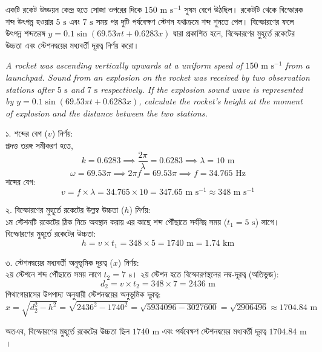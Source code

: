 \documentclass[12pt, a4paper]{article}
\begin{document}
\begin{tcolorbox}[questionbox={প্রশ্ন (Question) 8}]
\noindent
একটি রকেট উড্ডয়ন কেন্দ্র হতে সোজা ওপরের দিকে $150\text{ m s}^{-1}$ সুষম বেগে উঠছিল। রকেটটি থেকে বিস্ফোরক শব্দ উৎপন্ন হওয়ার $5\text{ s}$ এবং $7\text{ s}$ সময় পর দুটি পর্যবেক্ষণ স্টেশন যথাক্রমে শব্দ শুনতে পেল। বিস্ফোরণের ফলে উৎপন্ন শব্দতরঙ্গ $y = 0.1 \sin(69.53\pi t + 0.6283x)$ দ্বারা প্রকাশিত হলে, বিস্ফোরণের মুহূর্তে রকেটের উচ্চতা এবং স্টেশনদ্বয়ের মধ্যবর্তী দূরত্ব নির্ণয় করো।

\vspace{0.8em}
\begin{english}
\noindent\textit{\color{darkgray}
A rocket was ascending vertically upwards at a uniform speed of $150\text{ m s}^{-1}$ from a launchpad. Sound from an explosion on the rocket was received by two observation stations after $5\text{ s}$ and $7\text{ s}$ respectively. If the explosion sound wave is represented by $y = 0.1 \sin(69.53\pi t + 0.6283x)$, calculate the rocket's height at the moment of explosion and the distance between the two stations.
}
\end{english}
\end{tcolorbox}

\vspace{1em}

\begin{tcolorbox}[solutionbox={সমাধান (Solution)}]
\noindent
১. শব্দের বেগ ($v$) নির্ণয়: \\
প্রদত্ত তরঙ্গ সমীকরণ হতে,
\[ k = 0.6283 \implies \frac{2\pi}{\lambda} = 0.6283 \implies \lambda = 10\text{ m} \]
\[ \omega = 69.53\pi \implies 2\pi f = 69.53\pi \implies f = 34.765\text{ Hz} \]
শব্দের বেগ:
\[ v = f \times \lambda = 34.765 \times 10 = 347.65\text{ m s}^{-1} \approx 348\text{ m s}^{-1} \]

\noindent
২. বিস্ফোরণের মুহূর্তে রকেটের উল্লম্ব উচ্চতা ($h$) নির্ণয়: \\
১ম স্টেশনটি রকেটের ঠিক নিচে অবস্থান করায় এর কাছে শব্দ পৌঁছাতে সর্বনিম্ন সময় ($t_1 = 5\text{ s}$) লাগে। \\
বিস্ফোরণের মুহূর্তে রকেটের উচ্চতা:
\[ h = v \times t_1 = 348 \times 5 = 1740\text{ m} = 1.74\text{ km} \]

\noindent
৩. স্টেশনদ্বয়ের মধ্যবর্তী অনুভূমিক দূরত্ব ($x$) নির্ণয়: \\
২য় স্টেশনে শব্দ পৌঁছাতে সময় লাগে $t_2 = 7\text{ s}$। ২য় স্টেশন হতে বিস্ফোরণস্থলের লম্ব-দূরত্ব (অতিভুজ):
\[ d_2 = v \times t_2 = 348 \times 7 = 2436\text{ m} \]
পিথাগোরাসের উপপাদ্য অনুযায়ী স্টেশনদ্বয়ের অনুভূমিক দূরত্ব:
\[ x = \sqrt{d_2^2 - h^2} = \sqrt{2436^2 - 1740^2} = \sqrt{5934096 - 3027600} = \sqrt{2906496} \approx 1704.84\text{ m} \]

\vspace{0.5em}
\noindent
অতএব, বিস্ফোরণের মুহূর্তে রকেটের উচ্চতা ছিল $1740\text{ m}$ এবং পর্যবেক্ষণ স্টেশনদ্বয়ের মধ্যবর্তী দূরত্ব $1704.84\text{ m}$।
\end{tcolorbox}
\end{document}
